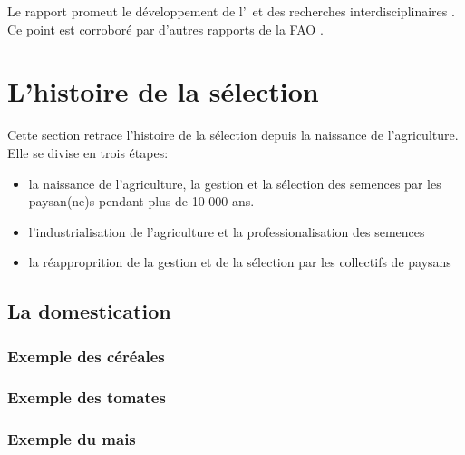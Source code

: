 Le rapport promeut le développement de l'\agec~et des recherches interdisciplinaires \cite{even_liaastd_2009}.
Ce point est corroboré par d'autres rapports de la FAO \cite{fao_international_2007,fao_biodiversity_2010}.


\section{L'histoire de la sélection}
Cette section retrace l'histoire de la sélection depuis la naissance de l'agriculture.
Elle se divise en trois étapes:
\begin{itemize}
\item la naissance de l'agriculture, la gestion et la sélection des semences par les paysan(ne)s pendant plus de 10 000 ans.
\item l'industrialisation de l'agriculture et la professionalisation des semences
\item la réapproprition de la gestion et de la sélection par les collectifs de paysans
\end{itemize}

\subsection{La domestication}

\subsubsection{Exemple des céréales}

\subsubsection{Exemple des tomates}

\subsubsection{Exemple du mais}


